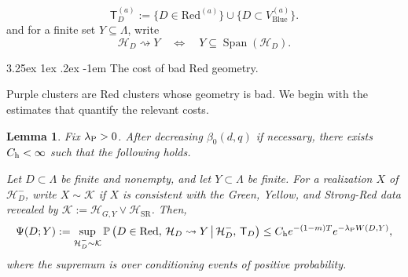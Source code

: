 \documentclass[letterpaper,11pt,reqno]{amsart}
\makeatletter
\newtheorem{lemma}[thm]{Lemma}
\theoremstyle{definition}
\renewcommand\paragraph{\@startsection{paragraph}{4}{\z@}%
  {3.25ex \@plus1ex \@minus.2ex}%
  {-1em}%
  {\normalfont\normalsize\bfseries}}
\makeatother
\begin{document}
\[
\mathsf T_D^{(a)}
        :=
        \{D\in\mathrm{Red}^{(a)}\}
        \cup
        \{D\subset V_{\mathrm{Blue}}^{(a)}\}.
\]
and for a finite set \(Y\subseteq\Lambda\), write
\[
        \mathcal H_D\rightsquigarrow Y
        \quad\Longleftrightarrow\quad
        Y\subseteq\operatorname{Span}(\mathcal H_D).
\]


\paragraph{The cost of bad Red geometry.}

Purple clusters are Red clusters whose geometry is bad. We begin with the estimates that quantify the relevant costs. 


\begin{lemma}\label{lem:single_bound}
Fix \(\lambda_{\rm P}>0\). After decreasing \(\beta_0(d,q)\) if necessary, there
exists \(C_{\rm h}<\infty\) such that the following holds.

Let \(D\subset\Lambda\) be finite and nonempty, and let \(Y\subset\Lambda\) be
finite. For a realization \(X\) of
\(\mathcal H_D^-\), write \(X\sim\mathcal K\) if \(X\) is consistent with the
Green, Yellow, and Strong-Red data revealed by \(\mathcal K:=\mathcal H_{G,Y}\vee\mathcal H_{\mathrm{SR}}\). Then,
\[
        \Psi(D;Y):=\sup_{\mathcal H_D^-\sim\mathcal K}
        \mathbb P\left(
        D\in\mathrm{Red},\,
        \mathcal H_D\rightsquigarrow Y
        \,\middle|\,
        \mathcal H_D^-,\,
        \mathsf T_D
        \right)
        \le
        C_{\rm h} e^{-(1-m)T}e^{-\lambda_{\rm P} W(D,Y)} ,
\]
where the supremum is over conditioning events of positive probability.
\end{lemma}
\end{document}
